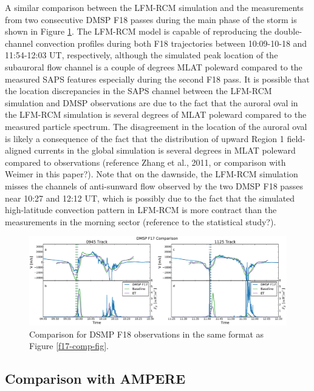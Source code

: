 \documentclass[draft,jgrga]{agutex}
\begin{document}
\begin{article}
A similar comparison between the LFM-RCM simulation and the measurements from two consecutive DMSP F18 passes during the main phase of the storm is shown in Figure \ref{f18-comp-fig}. The LFM-RCM model is capable of reproducing the double-channel convection profiles during both F18 trajectories between 10:09-10-18 and 11:54-12:03 UT, respectively, although the simulated peak location of the subauroral flow channel is a couple of degrees MLAT poleward compared to the measured SAPS features especially during the second F18 pass. It is possible that the location discrepancies in the SAPS channel between the LFM-RCM simulation and DMSP observations are due to the fact that the auroral oval in the LFM-RCM simulation is several degrees of MLAT poleward compared to the measured particle spectrum. The disagreement in the location of the auroral oval is likely a consequence of the fact that the distribution of upward Region 1 field-aligned currents in the global simulation is several degrees in MLAT poleward compared to observations (reference Zhang et al., 2011, or comparison with Weimer in this paper?). Note that on the dawnside, the LFM-RCM simulation misses the channels of anti-sunward flow observed by the two DMSP F18 passes near 10:27 and 12:12 UT, which is possibly due to the fact that the simulated high-latitude convection pattern in LFM-RCM is more contract than the measurements in the morning sector (reference to the statistical study?). 

\begin{figure}[t]
\noindent\includegraphics[width=39pc]{JGR-DMSPF17.pdf}
\caption{\label{f18-comp-fig}
Comparison for DSMP F18 observations in the same format as Figure \ref{f17-comp-fig}.}
\end{figure}

 \subsection{Comparison with AMPERE}
 \label{sec-ampere}


\end{article}
\end{document}
